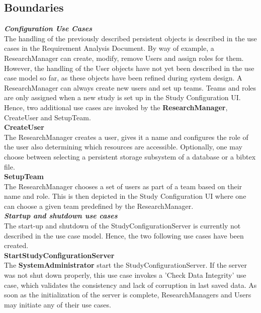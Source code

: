 \subsection{Boundaries}


\textit{\bf{Configuration Use Cases}} 
\\
The handling of the previously described persistent objects is described in the use cases in the Requirement Analysis Document. By way of example, a ResearchManager can create, modify, remove Users and assign roles for them. However, the handling of the User objects have not yet been described in the use case model so far, as these objects have been refined during system design. A ResearchManager can always create new users and set up teams. Teams and roles are only assigned when a new study is set up in the Study Configuration UI. Hence, two additional use cases are invoked by the \textbf{ResearchManager}, CreateUser and SetupTeam.
\\

\textbf{CreateUser}
\\
The ResearchManager creates a user, gives it a name and configures the role of the user also determining which resources are accessible. Optionally, one may choose between selecting a persistent storage subsystem of a database or a bibtex file. 
\\

\textbf{SetupTeam}
\\
The ResearchManager chooses a set of users as part of a team based on their name and role. This is then depicted in the Study Configuration UI where one can choose a given team predefined by the ResearchManager.
\\

\textit{\bf{Startup and shutdown use cases}} 
\\
The start-up and shutdown of the StudyConfigurationServer is currently not described in the use case model. Hence, the two following use cases have been created.
\\

\textbf{StartStudyConfigurationServer}
\\
The \textbf{SystemAdministrator} start the StudyConfigurationServer. If the server was not shut down properly, this use case invokes a 'Check Data Integrity' use case, which validates the consistency and lack of corruption in last saved data. As soon as the initialization of the server is complete, ResearchManagers and Users may initiate any of their use cases. 
\\

